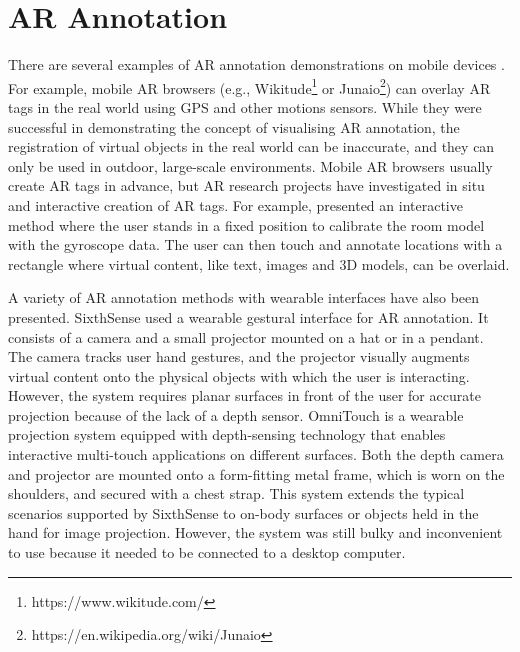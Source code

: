 
\section{AR Annotation}

There are several examples of AR annotation demonstrations on mobile devices \cite{Wither2009a, Gauglitz2014, Larabi2018, Grasset2012}. For example, mobile AR browsers (e.g., Wikitude\footnote{https://www.wikitude.com/} or Junaio\footnote{https://en.wikipedia.org/wiki/Junaio}) can overlay AR tags in the real world using GPS and other motions sensors. While they were successful in demonstrating the concept of visualising AR annotation, the registration of virtual objects in the real world can be inaccurate, and they can only be used in outdoor, large-scale environments. Mobile AR browsers usually create AR tags in advance, but  AR research projects have investigated in situ and interactive creation of AR tags. For example, \textcite{Kim2011} presented an interactive method where the user stands in a fixed position to calibrate the room model with the gyroscope data. The user can then touch and annotate locations with a rectangle where virtual content, like text, images and 3D models, can be overlaid. 

A variety of AR annotation methods with wearable interfaces have also been presented. SixthSense \cite{Mistry2009a} used a wearable gestural interface for AR annotation. It consists of a camera and a small projector mounted on a hat or in a pendant. The camera tracks user hand gestures, and the projector visually augments virtual content onto the physical objects with which the user is interacting. However, the system requires planar surfaces in front of the user for accurate projection because of the lack of a depth sensor. OmniTouch \cite{Hollerer1999a} is a wearable projection system equipped with depth-sensing technology that enables interactive multi-touch applications on different surfaces. Both the depth camera and projector are mounted onto a form-fitting metal frame, which is worn on the shoulders, and secured with a chest strap. This system extends the typical scenarios supported by SixthSense to on-body surfaces or objects held in the hand for image projection. However, the system was still bulky and inconvenient to use because it needed to be connected to a desktop computer.


